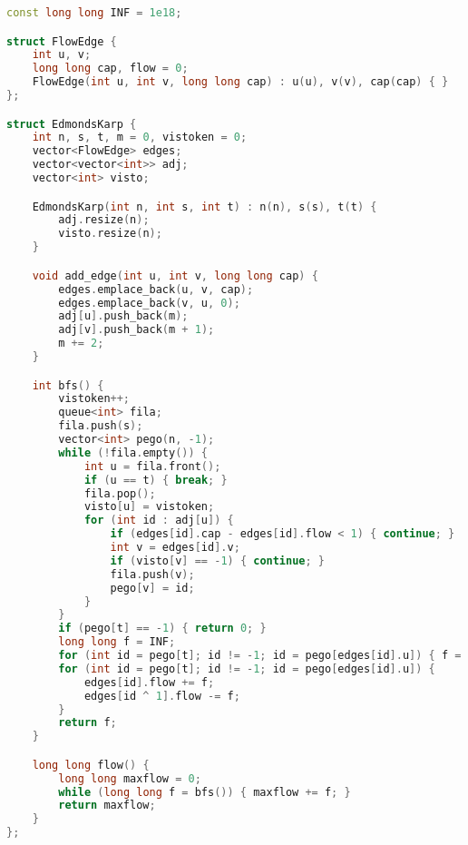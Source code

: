 \documentclass[11pt, a4paper, twoside]{book}
\begin{document}
\begin{lstlisting}[language=C++]
const long long INF = 1e18;

struct FlowEdge {
    int u, v;
    long long cap, flow = 0;
    FlowEdge(int u, int v, long long cap) : u(u), v(v), cap(cap) { }
};

struct EdmondsKarp {
    int n, s, t, m = 0, vistoken = 0;
    vector<FlowEdge> edges;
    vector<vector<int>> adj;
    vector<int> visto;

    EdmondsKarp(int n, int s, int t) : n(n), s(s), t(t) {
        adj.resize(n);
        visto.resize(n);
    }

    void add_edge(int u, int v, long long cap) {
        edges.emplace_back(u, v, cap);
        edges.emplace_back(v, u, 0);
        adj[u].push_back(m);
        adj[v].push_back(m + 1);
        m += 2;
    }

    int bfs() {
        vistoken++;
        queue<int> fila;
        fila.push(s);
        vector<int> pego(n, -1);
        while (!fila.empty()) {
            int u = fila.front();
            if (u == t) { break; }
            fila.pop();
            visto[u] = vistoken;
            for (int id : adj[u]) {
                if (edges[id].cap - edges[id].flow < 1) { continue; }
                int v = edges[id].v;
                if (visto[v] == -1) { continue; }
                fila.push(v);
                pego[v] = id;
            }
        }
        if (pego[t] == -1) { return 0; }
        long long f = INF;
        for (int id = pego[t]; id != -1; id = pego[edges[id].u]) { f = min(f, edges[id].cap - edges[id].flow); }
        for (int id = pego[t]; id != -1; id = pego[edges[id].u]) {
            edges[id].flow += f;
            edges[id ^ 1].flow -= f;
        }
        return f;
    }

    long long flow() {
        long long maxflow = 0;
        while (long long f = bfs()) { maxflow += f; }
        return maxflow;
    }
};
\end{lstlisting}

\hfill
\end{document}
